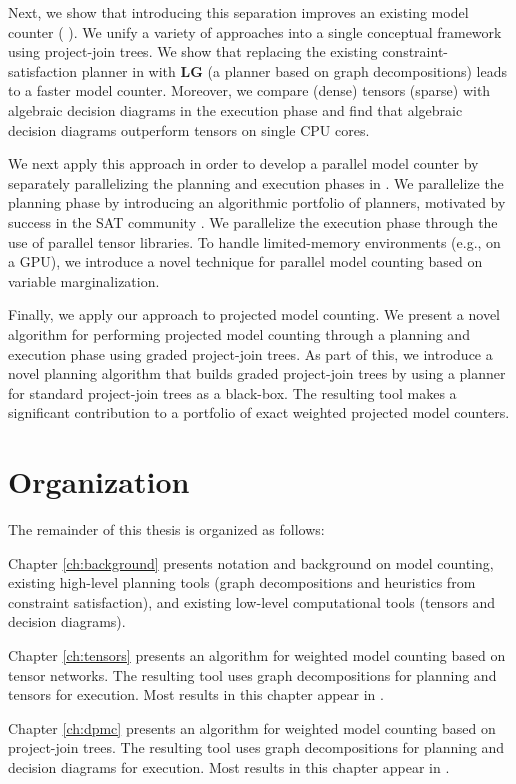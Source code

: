 Next, we show that introducing this separation improves an existing model counter ( \cite{DPV20}). We unify a variety of approaches into a single conceptual framework using project-join trees. We show that replacing the existing constraint-satisfaction planner in  with \textbf{LG} (a planner based on graph decompositions) leads to a faster model counter. Moreover, we compare (dense) tensors (sparse) with algebraic decision diagrams in the execution phase and find that algebraic decision diagrams outperform tensors on single CPU cores.

We next apply this approach in order to develop a parallel model counter by separately parallelizing the planning and execution phases in . We parallelize the planning phase by introducing an algorithmic portfolio of planners, motivated by success in the SAT community \cite{XHHL08}. We parallelize the execution phase through the use of parallel tensor libraries. To handle limited-memory environments (e.g., on a GPU), we introduce a novel technique for parallel model counting based on variable marginalization.

Finally, we apply our approach to projected model counting. We present a novel algorithm for performing projected model counting through a planning and execution phase using graded project-join trees. As part of this, we introduce a novel planning algorithm that builds graded project-join trees by using a planner for standard project-join trees as a black-box. The resulting tool  makes a significant contribution to a portfolio of exact weighted projected model counters.

\section{Organization}
The remainder of this thesis is organized as follows:

Chapter \ref{ch:background} presents notation and background on model counting, existing high-level planning tools (graph decompositions and heuristics from constraint satisfaction), and existing low-level computational tools (tensors and decision diagrams). 

Chapter \ref{ch:tensors} presents an algorithm for weighted model counting based on tensor networks. The resulting tool  uses graph decompositions for planning and tensors for execution. Most results in this chapter appear in \cite{DDV19}.

Chapter \ref{ch:dpmc} presents an algorithm for weighted model counting based on project-join trees. The resulting tool  uses graph decompositions for planning and decision diagrams for execution. Most results in this chapter appear in \cite{dudek2020dpmc}.

